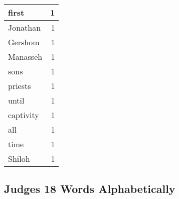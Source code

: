 \begin{center}
\begin{longtable}{l|r}
first & 1\\ \hline 
Jonathan & 1\\ \hline 
Gershom & 1\\ \hline 
Manasseh & 1\\ \hline 
sons & 1\\ \hline 
priests & 1\\ \hline 
until & 1\\ \hline 
captivity & 1\\ \hline 
all & 1\\ \hline 
time & 1\\ \hline 
Shiloh & 1\\ \hline 
\end{longtable}
\end{center}





\subsection{Judges 18 Words Alphabetically}


\normalsize
 
